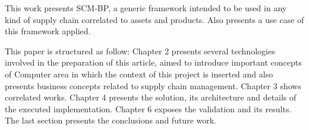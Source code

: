 This work presents \acf{SCM-BP}, a generic framework intended to be used in any kind of supply chain correlated to assets and products. Also presents a use case of this framework applied.

This paper is structured as follow: Chapter 2 presents several technologies involved in the preparation of this article, aimed to introduce important concepts of Computer area in which the context of this project is inserted and also presents business concepts related to supply chain management. Chapter 3 shows correlated works. Chapter 4 presents the solution, its architecture and details of the executed implementation. Chapter 6 exposes the validation and its results. The last section presents the conclusions and future work.